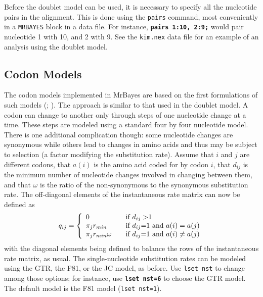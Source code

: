\documentclass[12pt]{book}
\newcommand{\ttt}[1]{\texttt{#1}}
\newcommand{\tb}[1]{\ttt{\textbf{#1}}}
\begin{document}
Before the doublet model can be used, it is necessary to specify all the nucleotide pairs in the
alignment. This is done using the \ttt{pairs} command, most conveniently in a \ttt{MRBAYES} block
in a data file. For instance, \tb{pairs 1:10, 2:9;} would pair nucleotide 1 with 10, and 2 with 9.
See the \ttt{kim.nex} data file for an example of an analysis using the doublet model.

\subsection{Codon Models}

The codon models implemented in MrBayes are based on the first formulations of such models
(\citet{goldman94}; \citet{muse94}). The approach is similar to that used in the doublet model. A
codon can change to another only through steps of one nucleotide change at a time. These steps are
modeled using a standard four by four nucleotide model. There is one additional complication
though: some nucleotide changes are synonymous while others lead to changes in amino acids and thus
may be subject to selection (a factor modifying the substitution rate). Assume that $i$ and $j$ are
different codons, that $a(i)$ is the amino acid coded for by codon $i$, that $d_{ij}$ is the
minimum number of nucleotide changes involved in changing between them, and that $\omega$ is the
ratio of the non-synonymous to the synonymous substitution rate. The off-diagonal elements of the
instantaneous rate matrix can now be defined as
\[
q_{ij} = \left\{
\begin{array}{l l}
  0 & \quad \text{if $d_{ij}>$1 } \\
 \pi_j r_{min} & \quad \text{if $d_{ij}$=1 and $a(i)=a(j)$}\\
 \pi_j r_{min} \omega & \quad \text{if $d_{ij}$=1 and $a(i)\neq a(j)$}\\
\end{array} \right.
\]
with the diagonal elements being defined to balance the rows of the instantaneous rate matrix, as
usual. The single-nucleotide substitution rates can be modeled using the GTR, the F81, or the JC
model, as before. Use \ttt{lset nst} to change among those options; for instance, use \tb{lset
nst=6} to choose the GTR model. The default model is the F81 model (\ttt{lset nst=1}).
\end{document}
